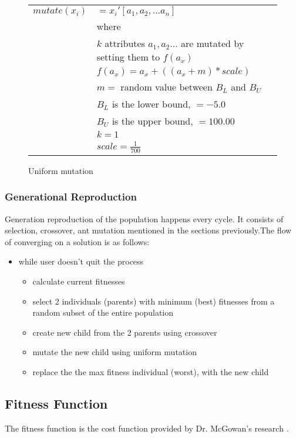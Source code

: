 \begin{figure}[!h]
        \begin{center}
		\begin{tabular}{r l}
		$ mutate(x_i) $ & $ = x_{i}{'}[a_1,a_2, ... a_n] $  \\
				& where \\
				& $ k $ attributes $ a_1, a_2... $ are mutated by setting them to $ f(a_x)  $ \\
				& $ f(a_x) = a_x + ( (a_x + m) * scale ) $ \\
				& $ m = $ random value between $ B_L $ and $B_U$ \\
				& $ B_L $ is the lower bound, $ = -5.0$ \\
				& $ B_U $ is the upper bound, $ = 100.00$ \\
				& $ k = 1 $ \\
				& $ scale = \frac{1}{700}$ 
		\end{tabular} 
               	\caption{Uniform mutation}
                \label{uniform_mutation}
        \end{center}
\end{figure}

\subsubsection{Generational Reproduction}
Generation reproduction of the population happens every cycle. It consists of
selection, crossover, ant mutation mentioned in the sections previously.The 
flow of converging on a solution is as follows:
\begin{itemize}
	\item while user doesn't quit the process
	\begin{itemize}
		\item calculate current fitnesses
		\item select 2 individuals (parents) with minimum (best) fitnesses from a random subset of the entire population
		\item create new child from the 2 parents using crossover
		\item mutate the new child using uniform mutation
		\item replace the the max fitness individual (worst), with the new child
	\end{itemize}
\end{itemize}

\subsection{Fitness Function}
\label{sec:fitness}
The fitness function is the cost function provided by Dr. McGowan's research
\cite{mcgowan_fit}.

